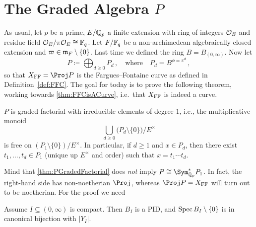 \documentclass[a4paper, 10pt, oneside, DIV=9, chapterprefix=true, numbers=enddot,bibliography=totoc]{scrbook}
\begin{document}
\section{The Graded Algebra \texorpdfstring{$P$}{P}}
As usual, let $p$ be a prime, $E/\mathbb{Q}_p$ a finite extension with ring of integers $\mathcal{O}_E$ and residue field $\mathcal{O}_E/\pi\mathcal{O}_E\cong \mathbb{F}_q$. Let $F/\mathbb{F}_q$ be a non-archimedean algebraically closed extension and $\varpi\in\mathfrak{m}_F\setminus\{0\}$.
Last time we defined the ring $B=B_{(0,\infty)}$. Now let
\begin{equation*}
	P\coloneqq \bigoplus_{d\geq 0}P_d\,,\quad\text{where}\quad P_d=B^{\phi=\pi^d}\,,
\end{equation*}
so that $X_\FFC=\Proj P$ is the Fargues--Fontaine curve as defined in Definition~\cref{def:FFC}. The goal for today is to prove the following theorem, working towards \cref{thm:FFCisACurve}, i.e.\ that $X_{\mathrm{FF}}$ is indeed a curve.
\begin{thm}\label{thm:PGradedFactorial}
	$P$ is graded factorial with irreducible elements of degree $1$, i.e., the multiplicative monoid
	\begin{equation*}
		\bigcup_{d\geq 0}\big(P_d\setminus\{0\}\big)/E^\times
	\end{equation*}
	is free on $(P_1\setminus\{0\})/E^\times$. In particular, if $d\geq 1$ and $x\in P_d$, then there exist $t_1,\dotsc,t_d\in P_1$ (unique up $E^\times$ and order) such that $x=t_1\dotsm t_d$.
\end{thm}
Mind that \cref{thm:PGradedFactorial} does \emph{not} imply $P\cong \Sym_{\IQ_p}^*P_1$. In fact, the right-hand side has non-noetherian $\Proj$, whereas $\Proj P=X_\FFC$ will turn out to be noetherian. For the proof we need
\begin{thm}\label{thm:BIPID}
	Assume $I\subseteq (0,\infty)$ is compact. Then $B_I$ is a PID, and $\operatorname{Spec} B_I\setminus\{0\}$ is in canonical bijection with $|Y_I|$.
\end{thm}
\end{document}
